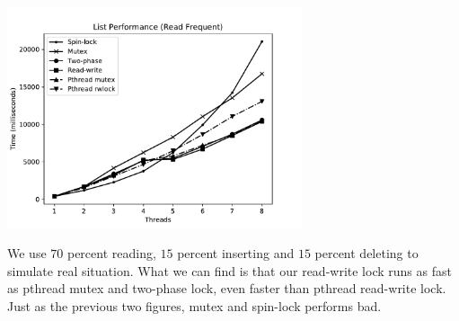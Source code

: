 \documentclass{article}
\begin{document}
\begin{center}
\includegraphics[width=0.65\textwidth]{OSLAB4_LIST3.pdf}
\end{center}
We use $70$ percent reading, $15$ percent inserting and $15$ percent deleting to simulate real situation. What we can find is that our read-write lock runs as fast as pthread mutex and two-phase lock, even faster than pthread read-write lock. Just as the previous two figures, mutex and spin-lock performs bad.
\end{document}
